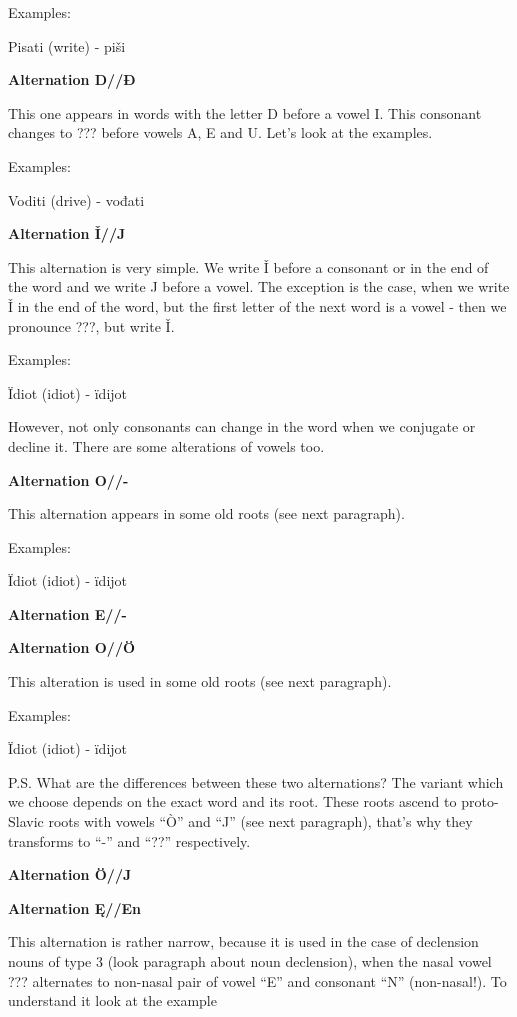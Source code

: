Examples:

Pisati (write) \textipa{[’pisat1]} - piši \textipa{[pi’\:s1]}


\textbf{Alternation D//Đ}

This one appears in words with the letter D before a vowel I. This consonant changes to ??? before vowels A, E and U. Let’s look at the examples.

Examples:

Voditi (drive) \textipa{[‘vodit1]} - vođati 


\textbf{Alternation Ǐ//J}

This alternation is very simple. We write Ǐ before a consonant or in the end of the word and we write J before a vowel. The exception is the case, when we write Ǐ in the end of the word, but the first letter of the next word is a vowel - then we pronounce ???, but write Ǐ.

Examples:

Ïdiot (idiot) \textipa{[id1’ot]} - ïdijot \textipa{[id1’Jot]}

However, not only consonants can change in the word when we conjugate or decline it. There are some alterations of vowels too.

\textbf{Alternation O//-}

This alternation appears in some old roots (see next paragraph).

Examples:

Ïdiot (idiot) \textipa{[id1’ot]} - ïdijot \textipa{[id1’Jot]}


\textbf{Alternation E//-}



\textbf{Alternation O//Ö}

This alteration is used in some old roots (see next paragraph).

Examples:

Ïdiot (idiot) \textipa{[id1’ot]} - ïdijot \textipa{[id1’Jot]}

P.S. What are the differences between these two alternations? The variant which we choose depends on the exact word and its root. These roots ascend to proto-Slavic roots with vowels “Ò” and “J” (see next paragraph), that’s why they transforms to “-” and “??” respectively.

\textbf{Alternation Ö//J}



\textbf{Alternation Ę//En}

This alternation is rather narrow, because it is used in the case of declension nouns of type 3 (look paragraph about noun declension), when the nasal vowel ??? alternates to non-nasal pair of vowel “E” and consonant “N” (non-nasal!). To understand it look at the example

